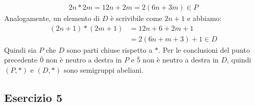 \begin{enumerate}[label=(\textit{\roman*})]
	\begin{align*}
		2n \ast 2m = 12 n + 2m = 2(6n+3m) \in P
	\end{align*}
	Analogamente, un elemento di $D$ è scrivibile come $2n+1$ e abbiamo:
	\begin{align*}
		(2n+1) \ast (2m+1) &= 12n+ 6 + 2m+1  \\
		&= 2(6n+m+3) +1 \in D
	\end{align*}
	Quindi sia $P$ che $D$ sono parti chiuse rispetto a $\ast$. Per le conclusioni del punto precedente $\overline{0}$ non è neutro a destra in $P$ e $\overline{5}$ non è neutro a destra in $D$, quindi $(P,\ast)$ e $(D,\ast)$ sono semigruppi abeliani.
\end{enumerate}
\subsection*{Esercizio 5}
